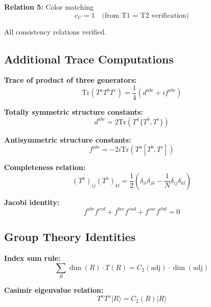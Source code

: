\documentclass[11pt,a4paper]{article}
\theoremstyle{definition}
\begin{document}
\textbf{Relation 5:} Color matching
\begin{equation}
  \label{eq:consist-5}
  c_C = 1 \quad \text{(from T1 = T2 verification)}
\end{equation}

All consistency relations verified.

\subsection{Additional Trace Computations}
\label{subsec:add-trace}

\textbf{Trace of product of three generators:}
\begin{equation}
  \label{eq:trace-3-gen}
  \text{Tr}(T^a T^b T^c) = \frac{1}{4}(d^{abc} + i f^{abc})
\end{equation}

\textbf{Totally symmetric structure constants:}
\begin{equation}
  \label{eq:d-abc-def}
  d^{abc} = 2 \text{Tr}(T^a \{T^b, T^c\})
\end{equation}

\textbf{Antisymmetric structure constants:}
\begin{equation}
  \label{eq:f-abc-def}
  f^{abc} = -2i \text{Tr}(T^a [T^b, T^c])
\end{equation}

\textbf{Completeness relation:}
\begin{equation}
  \label{eq:complete-1}
  (T^a)_{ij} (T^a)_{kl} = \frac{1}{2}\left(\delta_{il}\delta_{jk} - \frac{1}{N}\delta_{ij}\delta_{kl}\right)
\end{equation}

\textbf{Jacobi identity:}
\begin{equation}
  \label{eq:jacobi}
  f^{abe}f^{ecd} + f^{bce}f^{ead} + f^{cae}f^{ebd} = 0
\end{equation}

\subsection{Group Theory Identities}
\label{subsec:group-id}

\textbf{Index sum rule:}
\begin{equation}
  \label{eq:index-sum}
  \sum_R \dim(R) \cdot T(R) = C_2(\text{adj}) \cdot \dim(\text{adj})
\end{equation}

\textbf{Casimir eigenvalue relation:}
\begin{equation}
  \label{eq:casimir-eigen}
  T^a T^a |R\rangle = C_2(R) |R\rangle
\end{equation}
\end{document}
